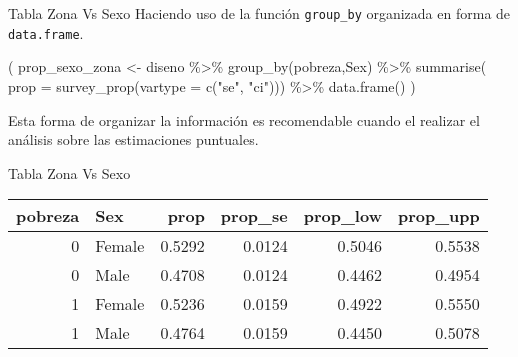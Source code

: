 \documentclass[
  ignorenonframetext,
]{beamer}
\newenvironment{Shaded}{\begin{snugshade}}{\end{snugshade}}
\newcommand{\AttributeTok}[1]{\textcolor[rgb]{0.77,0.63,0.00}{#1}}
\newcommand{\FunctionTok}[1]{\textcolor[rgb]{0.00,0.00,0.00}{#1}}
\newcommand{\NormalTok}[1]{#1}
\newcommand{\OtherTok}[1]{\textcolor[rgb]{0.56,0.35,0.01}{#1}}
\newcommand{\SpecialCharTok}[1]{\textcolor[rgb]{0.00,0.00,0.00}{#1}}
\newcommand{\StringTok}[1]{\textcolor[rgb]{0.31,0.60,0.02}{#1}}
\begin{document}
\begin{frame}[fragile]{Tabla Zona Vs Sexo}
\protect\hypertarget{tabla-zona-vs-sexo}{}
Haciendo uso de la función \texttt{group\_by} organizada en forma de
\texttt{data.frame}.

\begin{Shaded}
\begin{Highlighting}[]
\NormalTok{(}
\NormalTok{  prop\_sexo\_zona }\OtherTok{\textless{}{-}}\NormalTok{ diseno }\SpecialCharTok{\%\textgreater{}\%} 
    \FunctionTok{group\_by}\NormalTok{(pobreza,Sex) }\SpecialCharTok{\%\textgreater{}\%}
    \FunctionTok{summarise}\NormalTok{(}
      \AttributeTok{prop =} \FunctionTok{survey\_prop}\NormalTok{(}\AttributeTok{vartype =} \FunctionTok{c}\NormalTok{(}\StringTok{"se"}\NormalTok{, }\StringTok{"ci"}\NormalTok{))) }\SpecialCharTok{\%\textgreater{}\%} 
    \FunctionTok{data.frame}\NormalTok{()}
\NormalTok{)}
\end{Highlighting}
\end{Shaded}

Esta forma de organizar la información es recomendable cuando el
realizar el análisis sobre las estimaciones puntuales.
\end{frame}

\begin{frame}{Tabla Zona Vs Sexo}
\protect\hypertarget{tabla-zona-vs-sexo-1}{}
\scriptsize

\begin{longtable}[]{@{}rlrrrr@{}}
\toprule
pobreza & Sex & prop & prop\_se & prop\_low & prop\_upp \\
\midrule
\endhead
0 & Female & 0.5292 & 0.0124 & 0.5046 & 0.5538 \\
0 & Male & 0.4708 & 0.0124 & 0.4462 & 0.4954 \\
1 & Female & 0.5236 & 0.0159 & 0.4922 & 0.5550 \\
1 & Male & 0.4764 & 0.0159 & 0.4450 & 0.5078 \\
\bottomrule
\end{longtable}
\end{frame}
\end{document}
